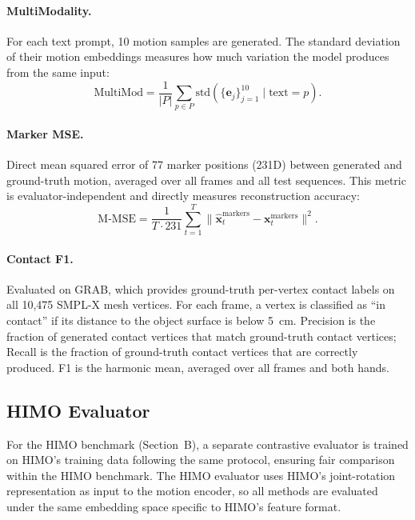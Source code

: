 \documentclass[sigconf, screen, review, anonymous]{acmart}
\begin{document}
\paragraph{MultiModality.}
For each text prompt, 10 motion samples are generated. The standard deviation of their motion embeddings measures how much variation the model produces from the same input:
\begin{equation}
  \text{MultiMod} = \frac{1}{|P|} \sum_{p \in P} \text{std}\left(\{\mathbf{e}_j\}_{j=1}^{10} \mid \text{text} = p\right).
\end{equation}

\paragraph{Marker MSE.}
Direct mean squared error of 77 marker positions (231D) between generated and ground-truth motion, averaged over all frames and all test sequences. This metric is evaluator-independent and directly measures reconstruction accuracy:
\begin{equation}
  \text{M-MSE} = \frac{1}{T \cdot 231} \sum_{t=1}^{T} \| \hat{\mathbf{x}}_t^{\text{markers}} - \mathbf{x}_t^{\text{markers}} \|^2.
\end{equation}

\paragraph{Contact F1.}
Evaluated on GRAB, which provides ground-truth per-vertex contact labels on all 10,475 SMPL-X mesh vertices. For each frame, a vertex is classified as ``in contact'' if its distance to the object surface is below 5~cm. Precision is the fraction of generated contact vertices that match ground-truth contact vertices; Recall is the fraction of ground-truth contact vertices that are correctly produced. F1 is the harmonic mean, averaged over all frames and both hands.

\subsection{HIMO Evaluator}

For the HIMO benchmark (Section~B), a separate contrastive evaluator is trained on HIMO's training data following the same protocol, ensuring fair comparison within the HIMO benchmark. The HIMO evaluator uses HIMO's joint-rotation representation as input to the motion encoder, so all methods are evaluated under the same embedding space specific to HIMO's feature format.
\end{document}
